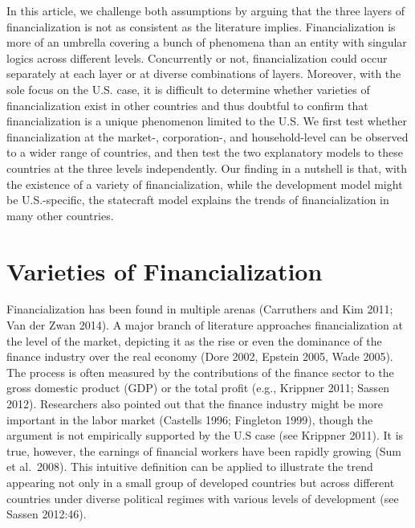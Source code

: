 \documentclass[
]{article}
\begin{document}
In this article, we challenge both assumptions by arguing that the three
layers of financialization is not as consistent as the literature
implies. Financialization is more of an umbrella covering a bunch of
phenomena than an entity with singular logics across different levels.
Concurrently or not, financialization could occur separately at each
layer or at diverse combinations of layers. Moreover, with the sole
focus on the U.S. case, it is difficult to determine whether varieties
of financialization exist in other countries and thus doubtful to
confirm that financialization is a unique phenomenon limited to the U.S.
We first test whether financialization at the market-, corporation-, and
household-level can be observed to a wider range of countries, and then
test the two explanatory models to these countries at the three levels
independently. Our finding in a nutshell is that, with the existence of
a variety of financialization, while the development model might be
U.S.-specific, the statecraft model explains the trends of
financialization in many other countries.

\hypertarget{varieties-of-financialization}{%
\section{Varieties of
Financialization}\label{varieties-of-financialization}}

Financialization has been found in multiple arenas (Carruthers and Kim
2011; Van der Zwan 2014). A major branch of literature approaches
financialization at the level of the market, depicting it as the rise or
even the dominance of the finance industry over the real economy (Dore
2002, Epstein 2005, Wade 2005). The process is often measured by the
contributions of the finance sector to the gross domestic product (GDP)
or the total profit (e.g., Krippner 2011; Sassen 2012). Researchers also
pointed out that the finance industry might be more important in the
labor market (Castells 1996; Fingleton 1999), though the argument is not
empirically supported by the U.S case (see Krippner 2011). It is true,
however, the earnings of financial workers have been rapidly growing
(Sum et al.~2008). This intuitive definition can be applied to
illustrate the trend appearing not only in a small group of developed
countries but across different countries under diverse political regimes
with various levels of development (see Sassen 2012:46).
\end{document}
